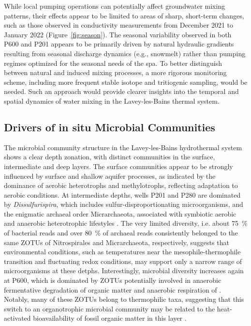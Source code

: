 While local pumping operations can potentially affect groundwater mixing patterns, their effects appear to be limited to areas of sharp, short-term changes, such as those observed in conductivity measurements from December 2021 to January 2022 (Figure~\ref{fig:season}).
The seasonal variability observed in both P600 and P201 appears to be primarily driven by natural hydraulic gradients resulting from seasonal discharge dynamics (e.g., snowmelt) rather than pumping regimes optimized for the seasonal needs of the spa.
To better distinguish between natural and induced mixing processes, a more rigorous monitoring scheme, including more frequent stable isotope and tritiogenic sampling, would be needed.
Such an approach would provide clearer insights into the temporal and spatial dynamics of water mixing in the Lavey-les-Bains thermal system.


\subsection{Drivers of in situ Microbial Communities}
The microbial community structure in the Lavey-les-Bains hydrothermal system shows a clear depth zonation, with distinct communities in the surface, intermediate and deep layers.
The surface communities appear to be strongly influenced by surface and shallow aquifer processes, as indicated by the dominance of aerobic heterotrophs and methylotrophs, reflecting adaptation to aerobic conditions.
At intermediate depths, wells P201 and P280 are dominated by \textit{Dissulfurispira}, which includes sulfur-disproportionating microorganisms, and the enigmatic archaeal order Micrarchaeota, associated with symbiotic aerobic and anaerobic heterotrophic lifestyles \citep{umezawa2021dissulfurispira, chen2018micrarchaeota, sakai2022micrarchaeota, kadnikov2020micrarachaeota}.
The very limited diversity, i.e. about \SI{75}{\percent} of bacterial reads and over \SI{80}{\percent} of archaeal reads consistently belonged to the same ZOTUs of Nitrospirales and Micrarchaeota, respectively, suggests that environmental conditions, such as temperatures near the mesophile-thermophile transition and fluctuating redox conditions, may support only a narrow range of microorganisms at these detphs.
Interestingly, microbial diversity increases again at P600, which is dominated by ZOTUs potentially involved in anaerobic fermentative degradation of organic matter and anaerobic respiration of .
Notably, many of these ZOTUs belong to thermophilic taxa, suggesting that this switch to an organotrophic microbial community may be related to the heat-activated bioavailability of fossil organic matter in this layer \citep{lagostina2021interactions}.

